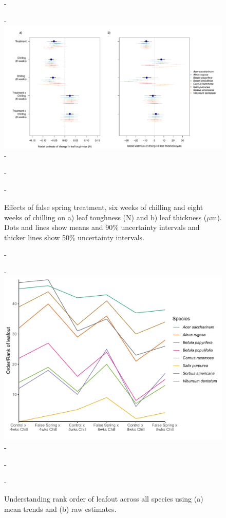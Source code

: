 \documentclass{article}\usepackage[]{graphicx}\usepackage[]{color}
\begin{document}
  {\begin{figure} [H]
  -\begin{center}
  -\includegraphics[width=18cm]{..//analyses/figures/mu_leaftraits.pdf} 
  -\caption{Effects of false spring treatment, six weeks of chilling and eight weeks of chilling on a) leaf toughness (N) and b) leaf thickness ($\mu$m). Dots and lines show means and 90\% uncertainty intervals and thicker lines show 50\% uncertainty intervals. }\label{fig:muleaf}
  -\end{center}
  -\end{figure}}
  
  {\begin{figure} [H]
  -\begin{center}
  -\includegraphics[width=12cm]{..//analyses/figures/leafoutorder_byrank.pdf} 
  -\caption{Understanding rank order of leafout across all species using (a) mean trends and (b) raw estimates. }\label{fig:rank}
  -\end{center}
  -\end{figure}}
  
\end{document}
